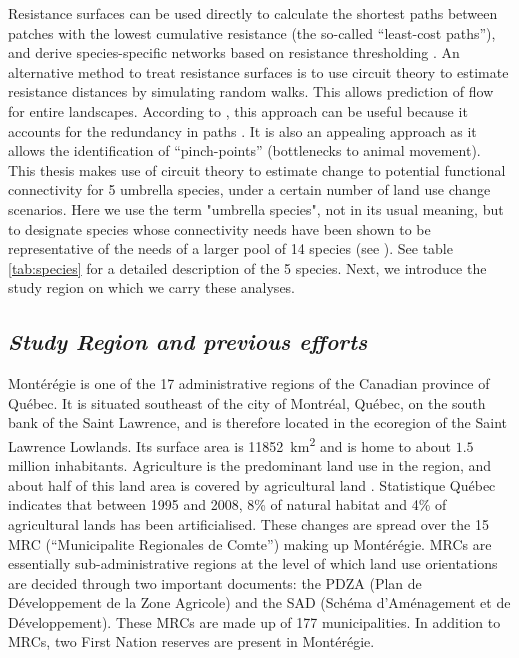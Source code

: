 \documentclass[12pt,Bold,TexShade]{thesis/mcgilletdclass}
\begin{document}
{Resistance surfaces can be used directly to calculate the shortest paths between patches with the lowest cumulative resistance (the so-called “least-cost paths”), and derive species-specific networks based on resistance thresholding \citep{lechner_characterising_2017}. An alternative method to treat resistance surfaces is to use circuit theory to estimate resistance distances by simulating random walks. This allows prediction of flow for entire landscapes. According to \cite{fletcher_spatial_2018}, this approach can be useful because it accounts for the redundancy in paths \citep{mcrae_isolation_2006, mcrae_mcrae_2008}. It is also an appealing approach as it allows the identification of “pinch-points” (bottlenecks to animal movement). \\

This thesis makes use of circuit theory to estimate change to potential functional connectivity for 5 umbrella species, under a certain number of land use change scenarios. Here we use the term "umbrella species", not in its usual meaning, but to designate species whose connectivity needs have been shown to be representative of the needs of a larger pool of 14 species (see \cite{albert_applying_2017, meurant_selecting_2018}). See table \ref{tab:species} for a detailed description of the 5 species. Next, we introduce the study region on which we carry these analyses. \\ \vspace{2em}

\subsection*{\textit{Study Region and previous efforts \\ \vspace{1em}}}

Montérégie is one of the 17 administrative regions of the Canadian province of Québec. It is situated southeast of the city of Montréal, Québec, on the south bank of the Saint Lawrence, and is therefore located in the ecoregion of the Saint Lawrence Lowlands. Its surface area is \SI{11852}{\km\squared} and is home to about $1.5$ million inhabitants. Agriculture is the predominant land use in the region, and about half of this land area is covered by agricultural land \citep{isq_quebec_2020}. Statistique Québec indicates that between 1995 and 2008, 8\% of natural habitat and 4\% of agricultural lands has been artificialised. These changes are spread over the 15 MRC (“Municipalite Regionales de Comte”) making up Montérégie. MRCs are essentially sub-administrative regions at the level of which land use orientations are decided through two important documents: the PDZA (Plan de Développement de la Zone Agricole) and the SAD (Schéma d'Aménagement et de Développement). These MRCs are made up of 177 municipalities. In addition to MRCs, two First Nation reserves are present in Montérégie. \\

}
\end{document}
